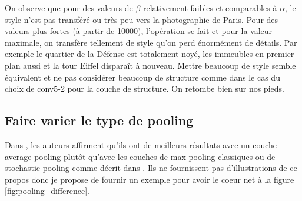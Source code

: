 \documentclass{article}
\begin{document}
On observe que pour des valeurs de $\beta$ relativement faibles et comparables à $\alpha$, le style n'est pas transféré ou très peu vers la photographie de Paris. Pour des valeurs plus fortes (à partir de 10000), l'opération se fait et pour la valeur maximale, on transfère tellement de style qu'on perd énormément de détails. Par exemple le quartier de la Défense est totalement noyé, les immeubles en premier plan aussi et la tour Eiffel disparaît à nouveau. Mettre beaucoup de style semble équivalent et ne pas considérer beaucoup de structure comme dans le cas du choix de conv5-2 pour la couche de structure. On retombe bien sur nos pieds.

\subsection*{Faire varier le type de pooling}
Dans \cite{DBLP:journals/corr/GatysEB15a}, les auteurs affirment qu'ils ont de meilleurs résultats avec un couche average pooling plutôt qu'avec les couches de max pooling classiques ou de stochastic pooling comme décrit dans \cite{DBLP:journals/corr/abs-1301-3557}. Ils ne fournissent pas d'illustrations de ce propos donc je propose de fournir un exemple pour avoir le coeur net à la figure \ref{fig:pooling_difference}.
\end{document}
